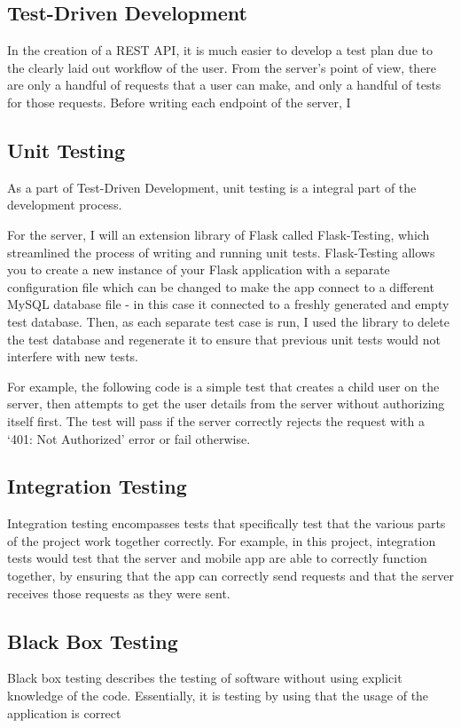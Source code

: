 \subsection{Test-Driven Development}
In the creation of a REST API, it is much easier to develop a test plan due to the clearly laid out workflow of the user. From the server's point of view, there are only a handful of requests that a user can make, and only a handful of tests for those requests. Before writing each endpoint of the server, I 

\subsection{Unit Testing} 
As a part of Test-Driven Development, unit testing is a integral part of the development process.


For the server, I will an extension library of Flask called Flask-Testing, which streamlined the process of writing and running unit tests.
Flask-Testing allows you to create a new instance of your Flask application with a separate configuration file which can be changed to make the app connect to a different MySQL database file - in this case it connected to a freshly generated and empty test database.
Then, as each separate test case is run, I used the library to delete the test database and regenerate it to ensure that previous unit tests would not interfere with new tests.

For example, the following code is a simple test that creates a child user on the server, then attempts to get the user details from the server without authorizing itself first. 
The test will pass if the server correctly rejects the request with a `401: Not Authorized' error or fail otherwise.


\subsection{Integration Testing}
Integration testing encompasses tests that specifically test that the various parts of the project work together correctly.
For example, in this project, integration tests would test that the server and mobile app are able to correctly function together, by ensuring that the app can correctly send requests and that the server receives those requests as they were sent.


\subsection{Black Box Testing}
Black box testing describes the testing of software without using explicit knowledge of the code.
Essentially, it is testing by using that the usage of the application is correct

